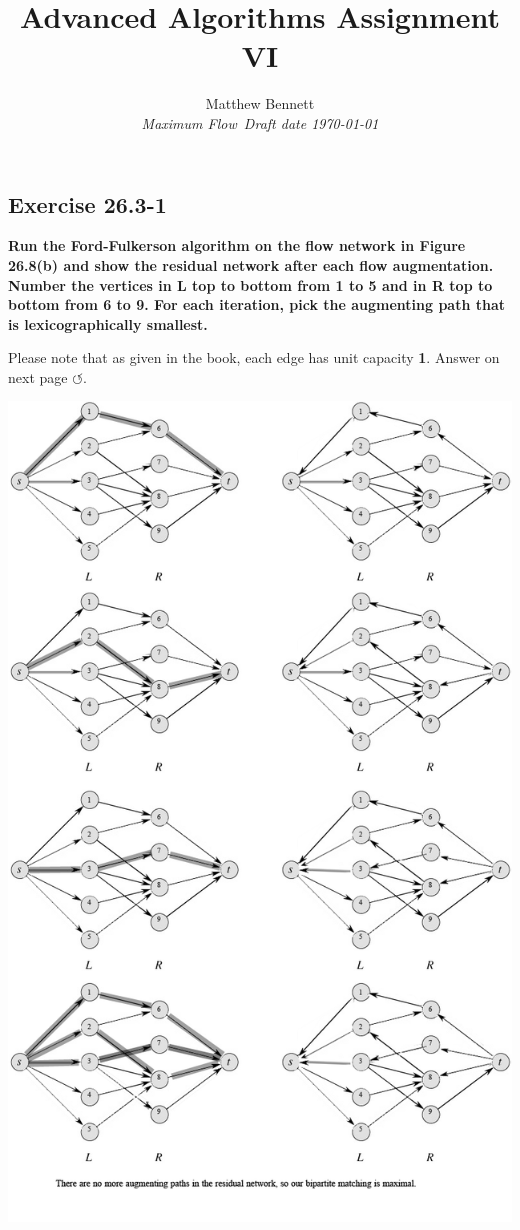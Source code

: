 \documentclass[10pt,fullpage]{article}
\title{ Advanced Algorithms Assignment VI }
\author{Matthew Bennett \\
{\small\em Maximum Flow\ Draft date \today }}
\date{ }
\begin{document}
\maketitle

\subsection*{Exercise 26.3-1}

\textbf{Run the Ford-Fulkerson algorithm on the flow network in
Figure 26.8(b) and show the residual network after each flow
augmentation. Number the vertices in L top to bottom from 1 to 5 and
in R top to bottom from 6 to 9. For each iteration, pick the
augmenting path that is lexicographically smallest.}

Please note that as given in the book, each edge has unit capacity
{\large \bf 1}. Answer on next page $\circlearrowleft$.

\includegraphics[scale=0.5]{fig268b.png}
\end{document}
